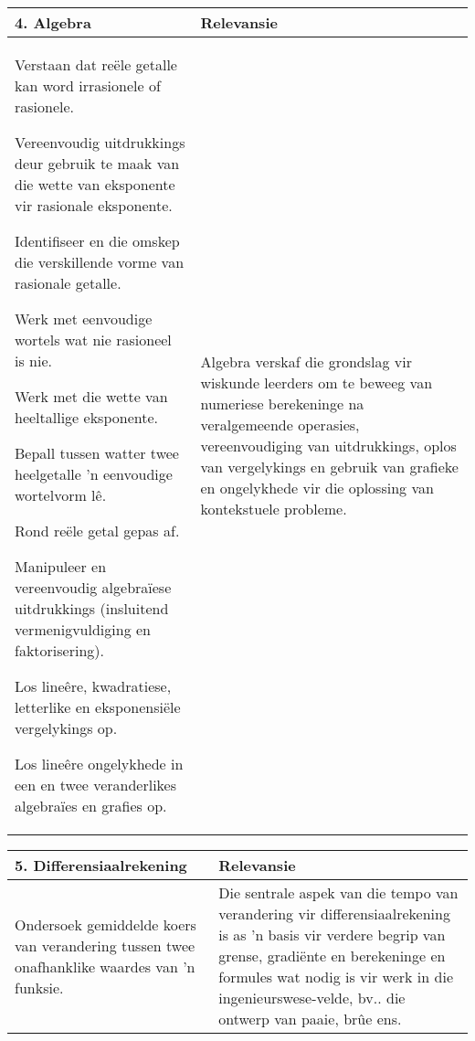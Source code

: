 \begin{table}[H]
\begin{center} 
\begin{tabular}{|p{8.5cm}|p{3.5cm}|} \hline
\textbf{4. Algebra}&\textbf{Relevansie}  \\ \hline  
Verstaan ​​dat re\"{e}le getalle kan word irrasionele of rasionele.\par
Vereenvoudig uitdrukkings deur gebruik te maak van die wette van eksponente vir rasionale eksponente.\par
Identifiseer en die omskep die verskillende vorme van rasionale getalle.\par
Werk met eenvoudige wortels wat nie rasioneel is nie.\par
Werk met die wette van heeltallige eksponente.\par
Bepall tussen watter twee heelgetalle 'n eenvoudige wortelvorm l\^{e}.\par
Rond re\"{e}le getal gepas af.\par
Manipuleer en vereenvoudig algebra\"{i}ese uitdrukkings (insluitend vermenigvuldiging en faktorisering).\par
Los line\^{e}re, kwadratiese, letterlike en eksponensiële vergelykings op.\par
Los line\^{e}re ongelykhede in een en twee veranderlikes algebraïes en grafies op.\par
&
Algebra verskaf die grondslag vir wiskunde leerders om te beweeg van
numeriese berekeninge na veralgemeende operasies, vereenvoudiging
van uitdrukkings, oplos van vergelykings en gebruik van
grafieke en ongelykhede vir die oplossing van kontekstuele probleme.
\\ \hline

 \end{tabular}
\end{center}
\end{table}

\begin{table}[H]
 \begin{center} 
\begin{tabular}{|p{8.5cm}|p{3.5cm}|} \hline
\textbf{5. Differensiaalrekening}& \textbf{Relevansie}\\ \hline  
Ondersoek gemiddelde koers van verandering tussen twee onafhanklike
waardes van 'n funksie.
&
Die sentrale aspek van die tempo van verandering vir
differensiaalrekening is as 'n basis vir verdere begrip van grense,
gradi\"{e}nte en berekeninge en formules wat nodig is vir werk in die
ingenieurswese-velde, bv.. die ontwerp van paaie, br\^{u}e ens.
\\ \hline

 \end{tabular}
\end{center}
\end{table}

